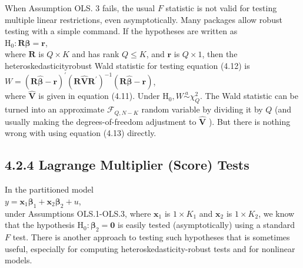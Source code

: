 \documentclass[10pt]{article}
\begin{document}
When Assumption OLS. 3 fails, the usual $F$ statistic is not valid for testing multiple linear restrictions, even asymptotically. Many packages allow robust testing with a simple command. If the hypotheses are written as\\
$\mathrm{H}_{0}: \mathbf{R} \boldsymbol{\beta}=\mathbf{r}$,\\
where $\mathbf{R}$ is $Q \times K$ and has rank $Q \leq K$, and $\mathbf{r}$ is $Q \times 1$, then the heteroskedasticityrobust Wald statistic for testing equation (4.12) is\\
$W=(\mathbf{R} \hat{\boldsymbol{\beta}}-\mathbf{r})^{\prime}\left(\mathbf{R} \hat{\mathbf{V}} \mathbf{R}^{\prime}\right)^{-1}(\mathbf{R} \hat{\boldsymbol{\beta}}-\mathbf{r})$,\\
where $\hat{\mathbf{V}}$ is given in equation (4.11). Under $\mathrm{H}_{0}, W \stackrel{a}{\sim} \chi_{Q}^{2}$. The Wald statistic can be turned into an approximate $\mathscr{F}_{Q, N-K}$ random variable by dividing it by $Q$ (and usually making the degrees-of-freedom adjustment to $\hat{\mathbf{V}}$ ). But there is nothing wrong with using equation (4.13) directly.

\subsection*{4.2.4 Lagrange Multiplier (Score) Tests}
In the partitioned model\\
$y=\mathbf{x}_{1} \boldsymbol{\beta}_{1}+\mathbf{x}_{2} \boldsymbol{\beta}_{2}+u$,\\
under Assumptions OLS.1-OLS.3, where $\mathbf{x}_{1}$ is $1 \times K_{1}$ and $\mathbf{x}_{2}$ is $1 \times K_{2}$, we know that the hypothesis $\mathrm{H}_{0}: \boldsymbol{\beta}_{2}=\mathbf{0}$ is easily tested (asymptotically) using a standard $F$ test. There is another approach to testing such hypotheses that is sometimes useful, especially for computing heteroskedasticity-robust tests and for nonlinear models.
\end{document}
